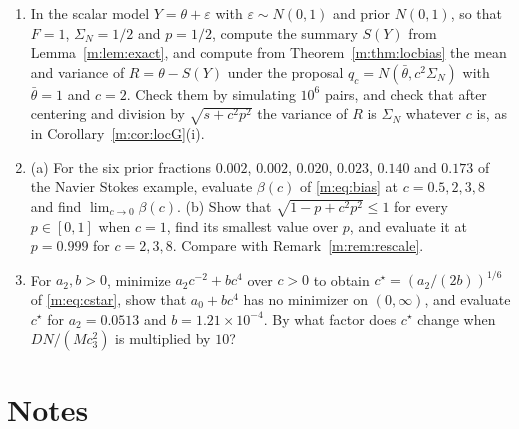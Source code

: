 \begin{enumerate}
\item In the scalar model $Y=\theta+\varepsilon$ with $\varepsilon\sim N(0,1)$ and prior $N(0,1)$, so that $F=1$, $\Sigma_N=1/2$ and $p=1/2$, compute the summary $S(Y)$ from Lemma~\ref{m:lem:exact}, and compute from Theorem~\ref{m:thm:locbias} the mean and variance of $R=\theta-S(Y)$ under the proposal $q_c=N(\bar\theta,c^2\Sigma_N)$ with $\bar\theta=1$ and $c=2$. Check them by simulating $10^6$ pairs, and check that after centering and division by $\sqrt{s+c^2p^2}$ the variance of $R$ is $\Sigma_N$ whatever $c$ is, as in Corollary~\ref{m:cor:locG}(i).
\item (a) For the six prior fractions $0.002$, $0.002$, $0.020$, $0.023$, $0.140$ and $0.173$ of the Navier Stokes example, evaluate $\beta(c)$ of \eqref{m:eq:bias} at $c=0.5,2,3,8$ and find $\lim_{c\to0}\beta(c)$. (b) Show that $\sqrt{1-p+c^2p^2}\le1$ for every $p\in[0,1]$ when $c=1$, find its smallest value over $p$, and evaluate it at $p=0.999$ for $c=2,3,8$. Compare with Remark~\ref{m:rem:rescale}.
\item For $a_2,b>0$, minimize $a_2c^{-2}+bc^4$ over $c>0$ to obtain $c^\star=(a_2/(2b))^{1/6}$ of \eqref{m:eq:cstar}, show that $a_0+bc^4$ has no minimizer on $(0,\infty)$, and evaluate $c^\star$ for $a_2=0.0513$ and $b=1.21\times10^{-4}$. By what factor does $c^\star$ change when $DN/(Mc_3^2)$ is multiplied by $10$?
\end{enumerate}

\section*{Notes}

